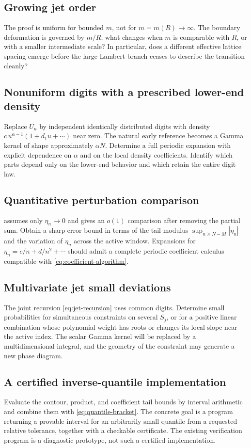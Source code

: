 \documentclass[11pt,a4paper]{article}
\numberwithin{equation}{section}
\theoremstyle{definition}
\begin{document}
\subsection{Growing jet order}
The proof is uniform for bounded $m$, not for $m=m(R)\to\infty$. The boundary deformation is governed by $m/R$; what changes when $m$ is comparable with $R$, or with a smaller intermediate scale? In particular, does a different effective lattice spacing emerge before the large Lambert branch ceases to describe the transition cleanly?

\subsection{Nonuniform digits with a prescribed lower-end density}
Replace $U_n$ by independent identically distributed digits with density
$c\,u^{\alpha-1}(1+d_1u+\cdots)$ near zero. The natural early reference becomes a Gamma kernel of shape approximately $\alpha N$. Determine a full periodic expansion with explicit dependence on $\alpha$ and on the local density coefficients. Identify which parts depend only on the lower-end behavior and which retain the entire digit law.

\subsection{Quantitative perturbation comparison}
 assumes only $\eta_n\to0$ and gives an $o(1)$ comparison after removing the partial sum. Obtain a sharp error bound in terms of the tail modulus $\sup_{n\geq N-M}|\eta_n|$ and the variation of $\eta_n$ across the active window. Expansions for $\eta_n=c/n+d/n^2+\cdots$ should admit a complete periodic coefficient calculus compatible with \eqref{eq:coefficient-algorithm}.

\subsection{Multivariate jet small deviations}
The joint recursion \eqref{eq:jet-recursion} uses common digits. Determine small probabilities for simultaneous constraints on several $S_j$, or for a positive linear combination whose polynomial weight has roots or changes its local slope near the active index. The scalar Gamma kernel will be replaced by a multidimensional integral, and the geometry of the constraint may generate a new phase diagram.

\subsection{A certified inverse-quantile implementation}
Evaluate the contour, product, and coefficient tail bounds by interval arithmetic and combine them with \eqref{eq:quantile-bracket}. The concrete goal is a program returning a provable interval for an arbitrarily small quantile from a requested relative tolerance, together with a checkable certificate. The existing verification program is a diagnostic prototype, not such a certified implementation.
\end{document}
